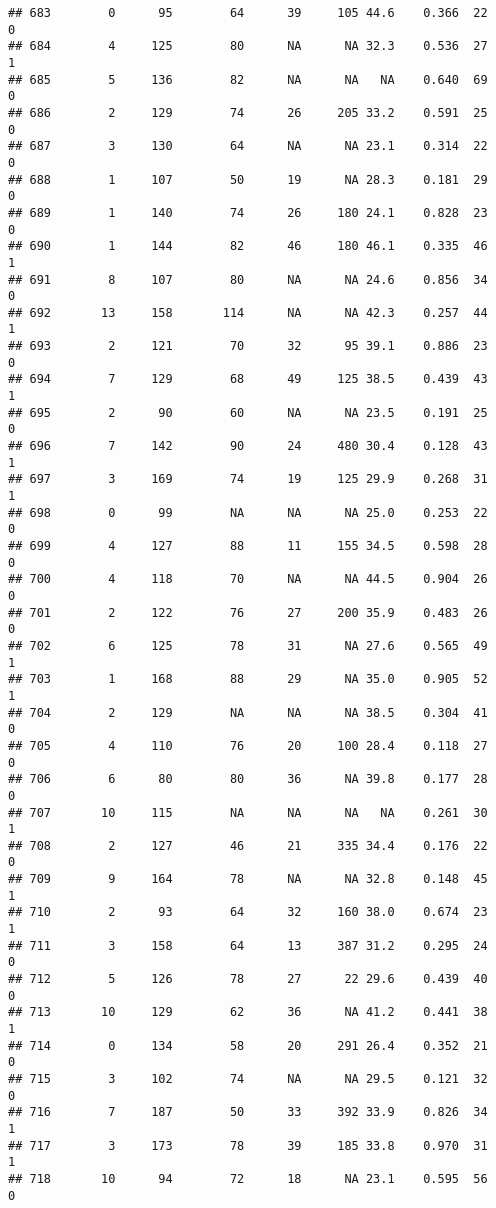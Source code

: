 \documentclass[
]{article}
\begin{document}
\begin{verbatim}
## 683        0      95        64      39     105 44.6    0.366  22    0
## 684        4     125        80      NA      NA 32.3    0.536  27    1
## 685        5     136        82      NA      NA   NA    0.640  69    0
## 686        2     129        74      26     205 33.2    0.591  25    0
## 687        3     130        64      NA      NA 23.1    0.314  22    0
## 688        1     107        50      19      NA 28.3    0.181  29    0
## 689        1     140        74      26     180 24.1    0.828  23    0
## 690        1     144        82      46     180 46.1    0.335  46    1
## 691        8     107        80      NA      NA 24.6    0.856  34    0
## 692       13     158       114      NA      NA 42.3    0.257  44    1
## 693        2     121        70      32      95 39.1    0.886  23    0
## 694        7     129        68      49     125 38.5    0.439  43    1
## 695        2      90        60      NA      NA 23.5    0.191  25    0
## 696        7     142        90      24     480 30.4    0.128  43    1
## 697        3     169        74      19     125 29.9    0.268  31    1
## 698        0      99        NA      NA      NA 25.0    0.253  22    0
## 699        4     127        88      11     155 34.5    0.598  28    0
## 700        4     118        70      NA      NA 44.5    0.904  26    0
## 701        2     122        76      27     200 35.9    0.483  26    0
## 702        6     125        78      31      NA 27.6    0.565  49    1
## 703        1     168        88      29      NA 35.0    0.905  52    1
## 704        2     129        NA      NA      NA 38.5    0.304  41    0
## 705        4     110        76      20     100 28.4    0.118  27    0
## 706        6      80        80      36      NA 39.8    0.177  28    0
## 707       10     115        NA      NA      NA   NA    0.261  30    1
## 708        2     127        46      21     335 34.4    0.176  22    0
## 709        9     164        78      NA      NA 32.8    0.148  45    1
## 710        2      93        64      32     160 38.0    0.674  23    1
## 711        3     158        64      13     387 31.2    0.295  24    0
## 712        5     126        78      27      22 29.6    0.439  40    0
## 713       10     129        62      36      NA 41.2    0.441  38    1
## 714        0     134        58      20     291 26.4    0.352  21    0
## 715        3     102        74      NA      NA 29.5    0.121  32    0
## 716        7     187        50      33     392 33.9    0.826  34    1
## 717        3     173        78      39     185 33.8    0.970  31    1
## 718       10      94        72      18      NA 23.1    0.595  56    0

\end{verbatim}
\end{document}
